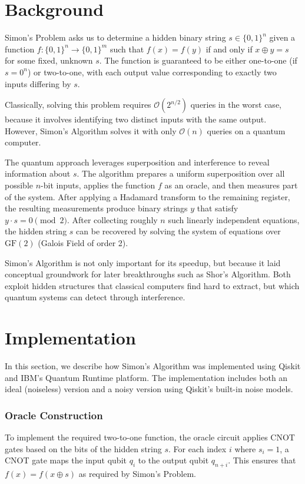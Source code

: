\documentclass[12pt]{article}
\begin{document}
\section*{Background}

Simon’s Problem asks us to determine a hidden binary string $s \in \{0,1\}^n$ given a function $f: \{0,1\}^n \rightarrow \{0,1\}^m$ such that $f(x) = f(y)$ if and only if $x \oplus y = s$ for some fixed, unknown $s$. The function is guaranteed to be either one-to-one (if $s = 0^n$) or two-to-one, with each output value corresponding to exactly two inputs differing by $s$.

Classically, solving this problem requires $\mathcal{O}(2^{n/2})$ queries in the worst case, because it involves identifying two distinct inputs with the same output. However, Simon’s Algorithm solves it with only $\mathcal{O}(n)$ queries on a quantum computer.

The quantum approach leverages superposition and interference to reveal information about $s$. The algorithm prepares a uniform superposition over all possible $n$-bit inputs, applies the function $f$ as an oracle, and then measures part of the system. After applying a Hadamard transform to the remaining register, the resulting measurements produce binary strings $y$ that satisfy $y \cdot s = 0 \pmod{2}$. After collecting roughly $n$ such linearly independent equations, the hidden string $s$ can be recovered by solving the system of equations over $\text{GF}(2)$ (Galois Field of order 2).

Simon’s Algorithm is not only important for its speedup, but because it laid conceptual groundwork for later breakthroughs such as Shor’s Algorithm. Both exploit hidden structures that classical computers find hard to extract, but which quantum systems can detect through interference.

\section*{Implementation}

In this section, we describe how Simon’s Algorithm was implemented using Qiskit and IBM’s Quantum Runtime platform. The implementation includes both an ideal (noiseless) version and a noisy version using Qiskit's built-in noise models.

\subsubsection*{Oracle Construction}
To implement the required two-to-one function, the oracle circuit applies CNOT gates based on the bits of the hidden string $s$. For each index $i$ where $s_i = 1$, a CNOT gate maps the input qubit $q_i$ to the output qubit $q_{n+i}$. This ensures that $f(x) = f(x \oplus s)$ as required by Simon's Problem.
\end{document}
